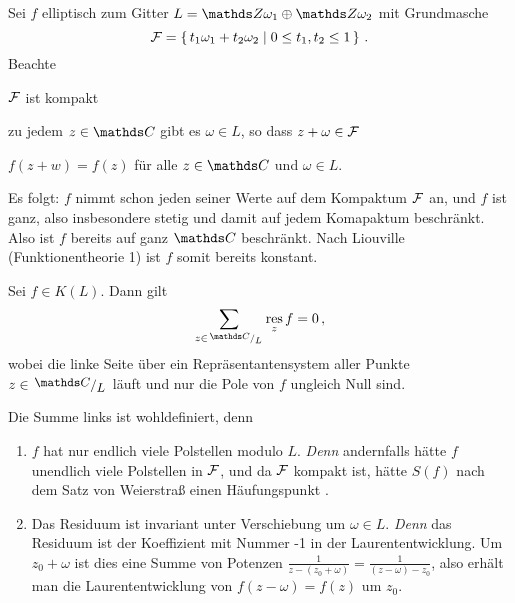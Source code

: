 \begin{bewe}
Sei $f$ elliptisch zum Gitter $L = \ZZ\omega_1 \oplus \ZZ\omega_2$ mit Grundmasche
\[
	\mathcal{F}
	= \left\{\,t_1\omega_1 + t_2\omega_2 \mid 0 \leq t_1, t_2 \leq 1\,\right\}
	\,.
\]
Beachte
\begin{enumerate*}
\item $\mathcal{F}$ ist kompakt
\item zu jedem $z\in\CC$ gibt es $\omega \in L$, so dass $z+\omega \in \mathcal{F}$
\item $f(z+w) = f(z)$ für alle $z \in \CC$ und $\omega \in L$.
\end{enumerate*}

Es folgt: $f$ nimmt schon jeden seiner Werte auf dem Kompaktum $\mathcal{F}$ an, und $f$ ist ganz, also insbesondere stetig und damit auf jedem Komapaktum beschränkt.
Also ist $f$ bereits auf ganz $\CC$ beschränkt.
Nach Liouville (Funktionentheorie 1) ist $f$ somit bereits konstant.
\end{bewe}

\begin{satz}\label{satz:liouville-2}
Sei $f \in K(L)$.
Dann gilt
\[
	\sum_{z\in\modulo{\CC}{L}} \res_z f
	= 0
	\,,
\]
wobei die linke Seite über ein Repräsentantensystem aller Punkte $z\in \modulo{\CC}{L}$ läuft und nur die Pole von $f$ ungleich Null sind.
\end{satz}

\begin{beme-noind}
Die Summe links ist wohldefiniert, denn
\begin{enumerate}
\item  $f$ hat nur endlich viele Polstellen modulo $L$.
\emph{Denn} andernfalls hätte $f$ unendlich viele Polstellen in $\mathcal{F}$, und da $\mathcal{F}$ kompakt ist, hätte $S(f)$ nach dem Satz von Weierstraß einen Häufungspunkt \blitz.

\item Das Residuum ist invariant unter Verschiebung um $\omega \in L$.
\emph{Denn} das Residuum ist der Koeffizient mit Nummer -1 in der Laurententwicklung.
Um $z_0 + \omega$ ist dies eine Summe von Potenzen $\frac{1}{z-(z_0+\omega)} = \frac{1}{(z-\omega)-z_0}$, also erhält man die Laurententwicklung von $f(z-\omega) = f(z)$ um $z_0$.
\end{enumerate}
\end{beme-noind}


